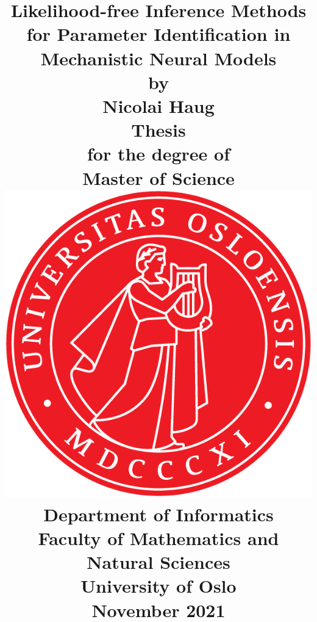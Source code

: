 \title{
    \Large \textbf{Likelihood-free Inference Methods for Parameter Identification in Mechanistic Neural Models}
    \\[8 pt]
    \large by
    \\ [8 pt]
    \large Nicolai Haug
    \\ [40 pt]
    \large \textbf{Thesis}
    \\ [8 pt]
    \large for the degree of
    \\ [8 pt]
    \large \textbf{Master of Science}
    \\ [30 pt]
    \includegraphics[scale=0.9]{latex/latex-report/Images/Logo/UiO/UiO_Segl_300dpi.png}
    \\ [30 pt]
    \large Department of Informatics
    \\ [8 pt]
    \large Faculty of Mathematics and Natural Sciences
    \\ [8 pt]
    \large University of Oslo
    \\ [15 pt]
    \large November 2021
}%

\author{\vspace{-5ex}}
\date{\vspace{-5ex}}

\maketitle